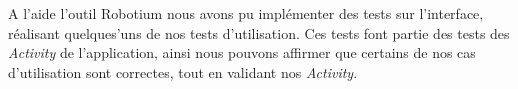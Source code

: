 A l'aide l'outil Robotium nous avons pu implémenter des tests sur l'interface, réalisant quelques'uns de nos tests d'utilisation. Ces tests font partie des tests des \emph{Activity} de l'application, ainsi nous pouvons affirmer que certains de nos cas d'utilisation sont correctes, tout en validant nos \emph{Activity}.